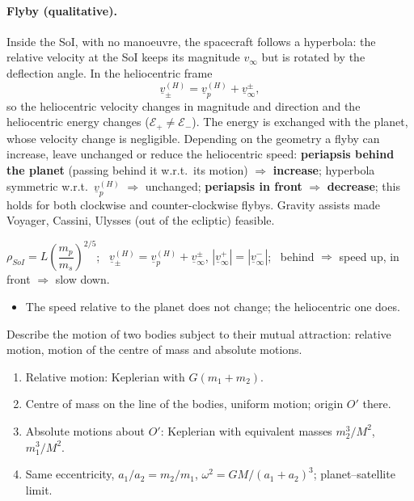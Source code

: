 \paragraph{Flyby (qualitative).} Inside the SoI, with no manoeuvre, the spacecraft follows a hyperbola: the relative velocity at the SoI keeps its
magnitude $v_\infty$ but is rotated by the deflection angle. In the heliocentric frame
\begin{equation}
\underline v^{(H)}_\pm=\underline v_p^{(H)}+\underline v_\infty^\pm ,
\end{equation}
so the heliocentric velocity changes in magnitude and direction and the heliocentric energy changes ($\mathcal E_+\neq\mathcal E_-$). The energy is
exchanged with the planet, whose velocity change is negligible. Depending on the geometry a flyby can increase, leave unchanged or reduce the
heliocentric speed: \textbf{periapsis behind the planet} (passing behind it w.r.t.\ its motion) $\Rightarrow$ \textbf{increase}; hyperbola symmetric
w.r.t.\ $\underline v_p^{(H)}$ $\Rightarrow$ unchanged; \textbf{periapsis in front} $\Rightarrow$ \textbf{decrease}; this holds for both clockwise and counter-clockwise
flybys. Gravity assists made Voyager, Cassini, Ulysses (out of the ecliptic) feasible.
\begin{keyf}
$\rho_{SoI}=L\left(\dfrac{m_p}{m_s}\right)^{2/5}$; \ $\underline v^{(H)}_\pm=\underline v_p^{(H)}+\underline v_\infty^\pm$, $|\underline v_\infty^+|=|\underline v_\infty^-|$; \ behind $\Rightarrow$ speed up, in front $\Rightarrow$ slow down.
\end{keyf}
\pitfalls
\begin{itemize}
\item The speed relative to the planet does not change; the heliocentric one does.
\end{itemize}

\begin{qbox}
Describe the motion of two bodies subject to their mutual attraction: relative motion, motion of the centre of mass and absolute motions.
\end{qbox}
\begin{outline}
\begin{enumerate}
\item Relative motion: Keplerian with $G(m_1+m_2)$.
\item Centre of mass on the line of the bodies, uniform motion; origin $O'$ there.
\item Absolute motions about $O'$: Keplerian with equivalent masses $m_2^3/M^2$, $m_1^3/M^2$.
\item Same eccentricity, $a_1/a_2=m_2/m_1$, $\omega^2=GM/(a_1+a_2)^3$; planet--satellite limit.
\end{enumerate}
\end{outline}
\answer
